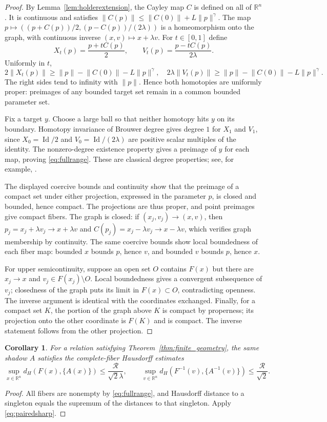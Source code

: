 \documentclass[11pt]{article}
\numberwithin{equation}{section}
\newtheorem{corollary}[theorem]{Corollary}
\theoremstyle{definition}
\theoremstyle{remark}
\newcommand{\R}{\mathbb R}
\newcommand{\Id}{\operatorname{Id}}
\newcommand{\rad}{\mathcal R}
\newcommand{\norm}[1]{\lVert #1\rVert}
\begin{document}
\begin{proof}
By Lemma~\ref{lem:holderextension}, the Cayley map $C$ is defined on all
of $\R^n$. It is continuous and satisfies
$\norm{C(p)}\le\norm{C(0)}+L\norm{p}^\gamma$.
The map
$p\mapsto((p+C(p))/2,(p-C(p))/(2\lambda))$
is a homeomorphism onto the graph, with continuous inverse $(x,v)\mapsto
x+\lambda v$. For $t\in[0,1]$ define
\[
 X_t(p)=\frac{p+tC(p)}2,\qquad
 V_t(p)=\frac{p-tC(p)}{2\lambda}.
\]
Uniformly in $t$,
\[
 2\norm{X_t(p)}\ge\norm{p}-\norm{C(0)}-L\norm{p}^\gamma,
 \quad
 2\lambda\norm{V_t(p)}\ge\norm{p}-\norm{C(0)}-L\norm{p}^\gamma.
\]
The right sides tend to infinity with $\norm p$. Hence both homotopies
are uniformly proper: preimages of any bounded target set remain in a
common bounded parameter set.

Fix a target $y$. Choose a large ball so that neither homotopy hits $y$
on its boundary. Homotopy invariance of Brouwer degree gives degree $1$
for $X_1$ and $V_1$, since $X_0=\Id/2$ and $V_0=\Id/(2\lambda)$ are
positive scalar multiples of the identity. The nonzero-degree existence
property gives a preimage of $y$ for each map, proving \eqref{eq:fullrange}.
These are classical degree properties; see, for example,
\cite{BenevieriFuriPeraSpadini}.

The displayed coercive bounds and continuity show that the preimage of
a compact set under either projection, expressed in the parameter $p$,
is closed and bounded, hence compact. The projections are thus proper,
and point preimages give compact fibers. The graph is closed: if
$(x_j,v_j)\to(x,v)$, then $p_j=x_j+\lambda v_j\to x+\lambda v$ and
$C(p_j)=x_j-\lambda v_j\to x-\lambda v$, which verifies graph membership
by continuity. The same coercive bounds show local boundedness of each
fiber map: bounded $x$ bounds $p$, hence $v$, and bounded $v$ bounds $p$,
hence $x$.

For upper semicontinuity, suppose an open set $O$ contains $F(x)$ but
there are $x_j\to x$ and $v_j\in F(x_j)\setminus O$. Local boundedness
gives a convergent subsequence of $v_j$; closedness of the graph puts its
limit in $F(x)\subset O$, contradicting openness. The inverse argument
is identical with the coordinates exchanged. Finally, for a compact
set $K$, the portion of the graph above $K$ is compact by properness;
its projection onto the other coordinate is $F(K)$ and is compact.
The inverse statement follows from the other projection.
\end{proof}

\begin{corollary}\label{cor:hausdorff}
For a relation satisfying Theorem~\ref{thm:finite_geometry}, the same
shadow $A$ satisfies the complete-fiber Hausdorff estimates
\[
 \sup_{x\in\R^n}d_H(F(x),\{A(x)\})\le\frac{\rad}{\sqrt2\lambda},
 \qquad
 \sup_{v\in\R^n}d_H(F^{-1}(v),\{A^{-1}(v)\})\le\frac{\rad}{\sqrt2}.
\]
\end{corollary}
\begin{proof}
All fibers are nonempty by \eqref{eq:fullrange}, and Hausdorff distance
to a singleton equals the supremum of the distances to that singleton.
Apply \eqref{eq:pairedsharp}.
\end{proof}
\end{document}
